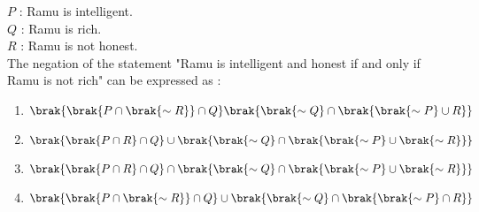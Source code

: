$P$ : Ramu is intelligent. \\
$Q$ : Ramu is rich. \\
$R$ : Ramu is not honest.\\
The negation of the statement "Ramu is intelligent and honest if and only if Ramu is not rich" can be expressed as : 
\begin{enumerate}
\item $\brak{\brak{P \cap \brak{\sim R}}\cap Q} \brak{\brak{\sim Q} \cap \brak{\brak{\sim P} \cup R}}$
\item $\brak{\brak{P \cap R} \cap Q} \cup\brak{\brak{\sim Q} \cap \brak{\brak{\sim P} \cup \brak{\sim R}}}$
\item $\brak{\brak{P \cap R} \cap Q} \cap \brak{\brak{\sim Q} \cap \brak{\brak{\sim P} \cup \brak{\sim R}}}$
\item $\brak{\brak{P \cap \brak{\sim R}} \cap Q} \cup \brak{\brak{\sim Q} \cap \brak{\brak{\sim P} \cap R}}$
\end{enumerate}

